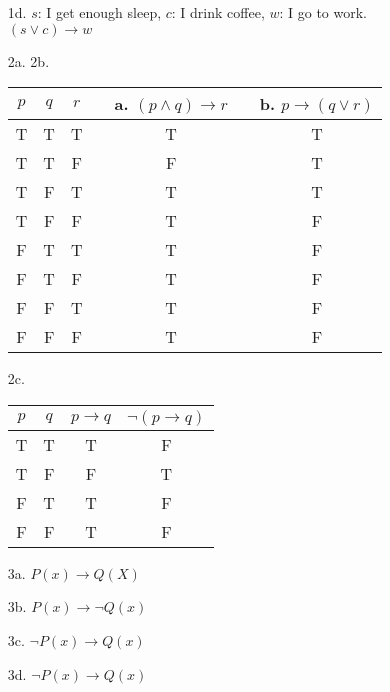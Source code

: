 {\begin{enumerate}
    \item[1d.]  $s$: I get enough sleep, $c$: I drink coffee, $w$: I go to work. \\
                $(s \lor c) \to w$

    \item[2a. 2b.] 
        \begin{tabular}{ c c c | p{2cm} c | p{2cm} c | }
            $p$ & $q$ & $r$ & & a. $(p \land q) \to r$ & & b. $p \to (q \lor r)$
            \\ \hline
            T & T & T &
            &  T  &
            &  T 

            \\
            T & T & F &
            &  F  &
            &  T 

            \\
            T & F & T & 
            &  T  &
            &  T 

            \\
            T & F & F &
            &  T  &
            &  F 

            \\
            F & T & T &
            &  T  &
            &  F 

            \\
            F & T & F &
            &  T  &
            &  F 

            \\
            F & F & T &
            &  T  &
            &  F 

            \\
            F & F & F &
            &  T  &
            &  F 
        \end{tabular}
    
    \item[2c.]
        \begin{tabular}{c c | c | c}
            $p$ & $q$ & $p \to q$ & $\neg(p \to q)$
            \\ \hline
            T & T
            &  T 
            &  F 
            \\
            T & F
            &  F 
            &  T 
            \\
            F & T
            &  T 
            &  F 
            \\
            F & F
            &  T 
            &  F 
        \end{tabular}

    \item[3a.]  $P(x) \to Q(X)$
    \item[3b.]  $P(x) \to \neg Q(x)$
    \item[3c.]  $\neg P(x) \to Q(x)$
    \item[3d.]  $\neg P(x) \to Q(x)$


\end{enumerate}}
